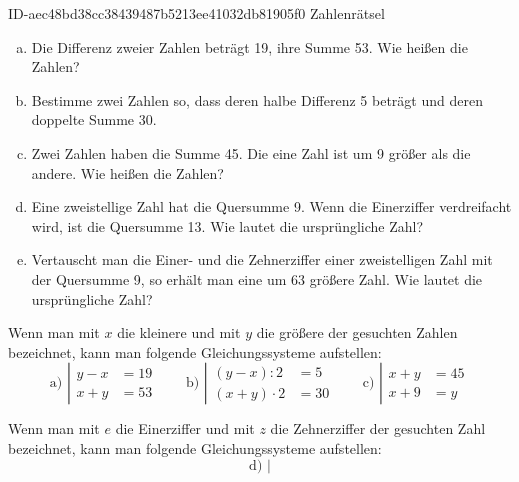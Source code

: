 \begin{exercise}
      {ID-aec48bd38cc38439487b5213ee41032db81905f0}
      {Zahlenrätsel}
  \ifproblem\problem
    \begin{enumerate}[a)]
      \item Die Differenz zweier Zahlen beträgt \num{19}, ihre Summe \num{53}. Wie heißen
            die Zahlen?
      \item Bestimme zwei Zahlen so, dass deren halbe Differenz \num{5} beträgt und deren
            doppelte Summe \num{30}.
      \item Zwei Zahlen haben die Summe \num{45}. Die eine Zahl ist um \num{9} größer als die andere.
            Wie heißen die Zahlen?
      \item Eine zweistellige Zahl hat die Quersumme \num{9}. Wenn die Einerziffer verdreifacht
            wird, ist die Quersumme \num{13}. Wie lautet die ursprüngliche Zahl?
      \item Vertauscht man die Einer- und die Zehnerziffer einer zweistelligen Zahl mit
            der Quersumme \num{9}, so erhält man eine um \num{63} größere Zahl. Wie lautet die
            ursprüngliche Zahl?
    \end{enumerate}
  \fi
  \ifoutline\outline
    Wenn man mit $x$ die kleinere und mit $y$ die größere der gesuchten Zahlen
    bezeichnet, kann man folgende Gleichungssysteme aufstellen:
    \begin{equation*}
      \text{a)~}
      \left|
      \begin{split}
        y-x&=\num{19}\\
        x+y&=\num{53}
      \end{split}
      \right.
      \qquad
      \text{b)~}
      \left|
      \begin{split}
        (y-x):2&=\num{5}\\
        (x+y)\cdot2&=\num{30}
      \end{split}
      \right.
      \qquad
      \text{c)~}
      \left|
      \begin{split}
        x+y&=\num{45}\\
        x+\num{9}&=y
      \end{split}
      \right.
    \end{equation*}\par
    Wenn man mit $e$ die Einerziffer und mit $z$ die Zehnerziffer der
    gesuchten Zahl bezeichnet, kann man folgende Gleichungssysteme aufstellen:
    \begin{equation*}
      \text{d)~}
      \left|

\end{equation*}
\end{exercise}
